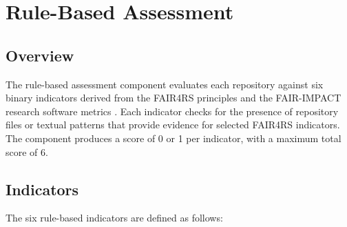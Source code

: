 \section{Rule-Based Assessment}

\subsection{Overview}

The rule-based assessment component evaluates each repository against 
six binary indicators derived from the FAIR4RS principles 
\cite{barker2022fair4rs} and the FAIR-IMPACT research software 
metrics \cite{chuehong2025frsm}. Each indicator checks for the 
presence of repository files or textual patterns that provide 
evidence for selected FAIR4RS indicators. The component produces a 
score of 0 or 1 per indicator, with a maximum total score of 6.

\subsection{Indicators}

The six rule-based indicators are defined as follows:

